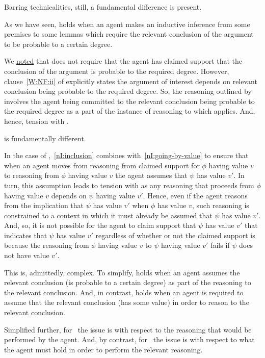 \begin{note}
  Barring technicalities, still, a fundamental difference is present.

  As we have seen, \wnf{} holds when an agent makes an inductive inference from some premises to some lemmas which require the relevant conclusion of the argument to be probable to a certain degree.

  We \hyperref[wnf:expectation]{noted} that \wnf{} does not require that the agent has claimed support that the conclusion of the argument is probable to the required degree.
  However, clause~\ref{W:NF:ii} of \wnf{} explicitly states the argument of interest depends on relevant conclusion being probable to the required degree.
  So, the reasoning outlined by \wnf{} involves the agent being committed to the relevant conclusion being probable to the required degree as a part of the instance of reasoning to which \wnf{} applies.
  And, hence, tension with \eiS{}.

  \nI{} is fundamentally different.

  In the case of \nI{},~\ref{nI:inclusion} combines with~\ref{nI:going-by-value} to ensure that when an agent moves from reasoning from claimed support for \(\phi\) having value \(v\) to reasoning from \(\phi\) having value \(v\) the agent assumes that \(\psi\) has value \(v'\).
  In turn, this assumption leads to tension with \eiS{} as any reasoning that proceeds from \(\phi\) having value \(v\) depends on \(\psi\) having value \(v'\).
  Hence, even if the agent reasons from the implication that \(\psi\) has value \(v'\) when \(\phi\) has value \(v\), such reasoning is constrained to a context in which it must already be assumed that \(\psi\) has value \(v'\).
  And, so, it is not possible for the agent to claim support that \(\psi\) has value \(v'\) that indicates that \(\psi\) has value \(v'\) regardless of whether or not the claimed support is \mom{} because the reasoning from \(\phi\) having value \(v\) to \(\psi\) having value \(v'\) fails if \(\psi\) does not have value \(v'\).

  This is, admittedly, complex.
  To simplify, \wnf{} holds when an agent assumes the relevant conclusion (is probable to a certain degree) as part of the reasoning to the relevant conclusion.
  And, in contrast, \nI{} holds when an agent is required to assume that the relevant conclusion (has some value) in order to reason to the relevant conclusion.

  Simplified further, for~\wnf{} the issue is with respect to the reasoning that would be performed by the agent.
  And, by contrast, for~\nI{} the issue is with respect to what the agent must hold in order to perform the relevant reasoning.


\end{note}
